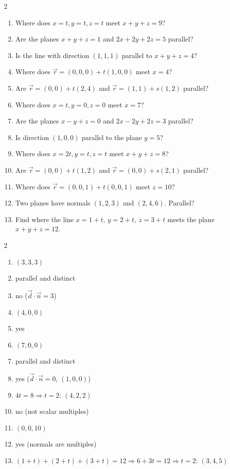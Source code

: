 \documentclass[11pt]{article}
\begin{document}
\begin{recapbox}
\begin{multicols}{2}
\small
\begin{enumerate}[leftmargin=*,itemsep=3pt]
  \item Where does $x=t,y=t,z=t$ meet $x+y+z=9$?
  \item Are the planes $x+y+z=1$ and $2x+2y+2z=5$ parallel?
  \item Is the line with direction $(1,1,1)$ parallel to $x+y+z=4$?
  \item Where does $\vec r=(0,0,0)+t(1,0,0)$ meet $x=4$?
  \item Are $\vec r=(0,0)+t(2,4)$ and $\vec r=(1,1)+s(1,2)$ parallel?
  \item Where does $x=t,y=0,z=0$ meet $x=7$?
  \item Are the planes $x-y+z=0$ and $2x-2y+2z=3$ parallel?
  \item Is direction $(1,0,0)$ parallel to the plane $y=5$?
  \item Where does $x=2t,y=t,z=t$ meet $x+y+z=8$?
  \item Are $\vec r=(0,0)+t(1,2)$ and $\vec r=(0,0)+s(2,1)$ parallel?
  \item Where does $\vec r=(0,0,1)+t(0,0,1)$ meet $z=10$?
  \item Two planes have normals $(1,2,3)$ and $(2,4,6)$. Parallel?
  \item Find where the line $x=1+t,\ y=2+t,\ z=3+t$ meets the plane $x+y+z=12$.
\end{enumerate}
\end{multicols}
\end{recapbox}

\begin{keybox}
\begin{multicols}{2}
\small
\begin{enumerate}[leftmargin=*,itemsep=3pt]
  \item $(3,3,3)$
  \item parallel and distinct
  \item no ($\vec d\cdot\vec n=3$)
  \item $(4,0,0)$
  \item yes
  \item $(7,0,0)$
  \item parallel and distinct
  \item yes ($\vec d\cdot\vec n=0$, $(1,0,0)$)
  \item $4t=8\Rightarrow t=2$: $(4,2,2)$
  \item no (not scalar multiples)
  \item $(0,0,10)$
  \item yes (normals are multiples)
  \item $(1+t)+(2+t)+(3+t)=12\Rightarrow 6+3t=12\Rightarrow t=2$: $(3,4,5)$
\end{enumerate}
\end{multicols}
\end{keybox}
\end{document}
